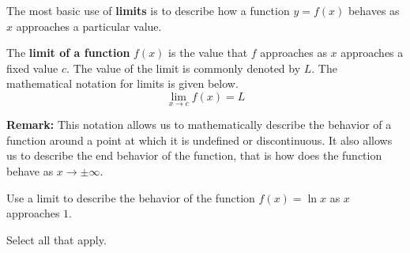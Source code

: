 \documentclass[handout]{ximera}  %
\begin{document}
\begin{itemize}
    
    The most basic use of \textbf{limits} is to
    describe how a function $y=f(x)$ behaves as $x$ approaches a
    particular value.
    
    
    \begin{definition}
    The \textbf{limit of a function} $f(x)$ is the value that $f$
    approaches as $x$ approaches a fixed value $c.$  The value of
    the limit is commonly denoted by $L$.  The mathematical notation
    for limits is given below.
    \[ \lim_{x \rightarrow c} f(x) = L  \] 
    \end{definition}

    
    \textbf{Remark:} This notation allows us to mathematically describe the behavior of a function around a point at
    which it is undefined or discontinuous.  It also allows us to describe the end behavior of the function, that is how does
    the function behave as $x \rightarrow \pm \infty$.
    
    \begin{question} Use a limit to describe the behavior of the function $f(x)=\ln x$ as $x$ approaches $1.$  


Select all that apply.   \\  \\  %

\begin{multipleChoice}
    \end{multipleChoice}  
    \end{question}  
 

\end{itemize}
\end{document}
